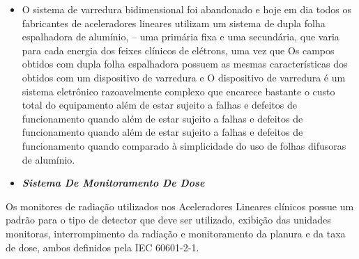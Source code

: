 \documentclass[11pt,a4paper]{article}
\begin{document}
\begin{itemize}
\begin{enumerate}
			\end{enumerate}
		\item O sistema de varredura bidimensional foi abandonado e hoje em dia todos os fabricantes de aceleradores lineares utilizam um sistema de dupla folha espalhadora de alumínio, – uma primária fixa e uma secundária, que varia para cada energia dos feixes clínicos de elétrons, uma vez que Os campos obtidos com dupla folha espalhadora possuem as mesmas características dos obtidos com um dispositivo de varredura e O dispositivo de varredura é um sistema eletrônico razoavelmente complexo que encarece bastante o custo total do equipamento além de estar sujeito a falhas e defeitos de funcionamento quando além de estar sujeito a falhas e defeitos de funcionamento quando além de estar sujeito a falhas e defeitos de funcionamento quando comparado à simplicidade do uso de folhas difusoras de alumínio.
	\end{itemize}


                \begin{itemize}
                    \item \textbf{\textit{\textcolor{CarnationPink}{Sistema De Monitoramento De Dose}}}
                \end{itemize}

    Os monitores de radiação utilizados nos Aceleradores Lineares clínicos possue um padrão para o tipo de detector que deve ser utilizado, exibição das unidades monitoras, interrompimento da radiação e monitoramento da planura e da taxa de dose, ambos definidos pela IEC 60601-2-1.
\end{document}
